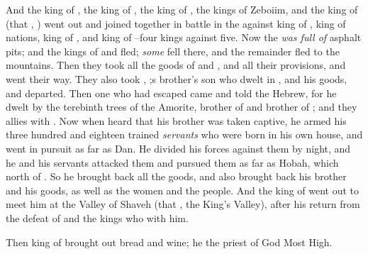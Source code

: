 \bverse And the king of , the king of , the king of , the kings of Zeboiim, and the king of  (that \is, ) went out and joined together in battle in the 
\bverse against  king of ,  king of nations,  king of , and  king of --four kings against five.
\bverse Now the  \textit{was full of} asphalt pits; and the kings of  and  fled; \textit{some} fell there, and the remainder fled to the mountains.
\bverse Then they took all the goods of  and , and all their provisions, and went their way.
\bverse They also took , ;s brother's son who dwelt in , and his goods, and departed.
\bverse Then one who had escaped came and told  the Hebrew, for he dwelt by the terebinth trees of  the Amorite, brother of  and brother of ; and they \were allies with .
\bverse Now when  heard that his brother was taken captive, he armed his three hundred and eighteen trained \textit{servants} who were born in his own house, and went in pursuit as far as Dan.
\bverse He divided his forces against them by night, and he and his servants attacked them and pursued them as far as Hobah, which \is north of .
\bverse So he brought back all the goods, and also brought back his brother  and his goods, as well as the women and the people.
\bverse And the king of  went out to meet him at the Valley of Shaveh (that \is, the King's Valley), after his return from the defeat of  and the kings who \were with him.


\bverse Then  king of  brought out bread and wine; he \was the priest of God Most High.

